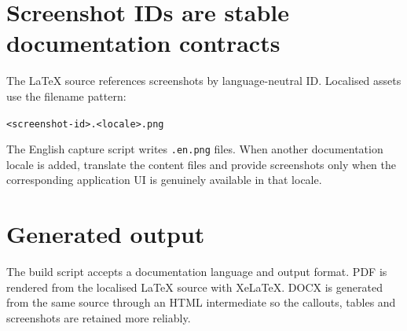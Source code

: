 \section{Screenshot IDs are stable documentation contracts}
The LaTeX source references screenshots by language-neutral ID. Localised assets use the filename pattern:

\begin{center}
\texttt{<screenshot-id>.<locale>.png}
\end{center}

The English capture script writes \texttt{.en.png} files. When another documentation locale is added, translate the content files and provide screenshots only when the corresponding application UI is genuinely available in that locale.

\section{Generated output}
The build script accepts a documentation language and output format. PDF is rendered from the localised LaTeX source with XeLaTeX. DOCX is generated from the same source through an HTML intermediate so the callouts, tables and screenshots are retained more reliably.
